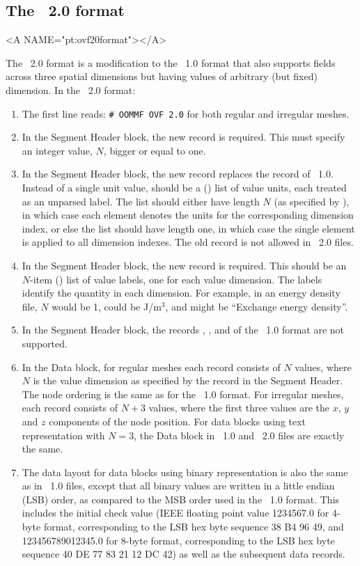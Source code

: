 \subsection{The \OVF\ 2.0 format}\label{sec:ovf20format}
\begin{rawhtml}
<A NAME="pt:ovf20format"></A>
\end{rawhtml}
The \OVF~2.0 format is a modification to the \OVF~1.0 format that also
supports fields across three spatial dimensions but having values of
arbitrary (but fixed) dimension.  In the \OVF~2.0 format:
\begin{enumerate}
\item The first line reads: \verb+# OOMMF OVF 2.0+ for both
regular and irregular meshes.
\item In the Segment Header block, the new record  is
required.  This must specify an integer value, $N$, bigger or equal to
one.
\item In the Segment Header block, the new  record
replaces the  record of \OVF~1.0.  Instead of a single
unit value,  should be a (\Tcl) list of value units, each
treated as an unparsed label.  The list should either have length $N$
(as specified by ), in which case each element denotes
the units for the corresponding dimension index, or else the list
should have length one, in which case the single element is applied to
all dimension indexes.  The old  record is not allowed
in \OVF~2.0 files.
\item In the Segment Header block, the new  record is
required.  This should be an $N$-item (\Tcl) list of value labels, one
for each value dimension.  The labels identify the quantity in each
dimension.  For example, in an energy density file, $N$ would be 1,
 could be J/m${}^3$, and  might be
``Exchange energy density''.
\item In the Segment Header block, the records
, ,  and
 of the \OVF~1.0 format are not supported.
\item In the Data block, for regular meshes each record consists of
$N$ values, where $N$ is the value dimension as specified by the
 record in the Segment Header.  The node ordering is
the same as for the \OVF~1.0 format.  For irregular meshes, each
record consists of $N+3$ values, where the first three values are the
$x$, $y$ and $z$ components of the node position.  For data blocks
using text representation with $N = 3$, the Data block in
\OVF~1.0 and \OVF~2.0 files are exactly the same.
\item The data layout for data blocks using binary representation is
also the same as in \OVF~1.0 files, except that all binary values are
written in a little endian (LSB) order, as compared to the MSB order
used in the \OVF~1.0 format.  This includes the initial check value
(IEEE floating point value 1234567.0 for 4-byte format, corresponding
to the LSB hex byte sequence 38 B4 96 49, and 123456789012345.0 for
8-byte format, corresponding to the LSB hex byte sequence 40 DE 77 83
21 12 DC 42) as well as the subsequent data records.
\end{enumerate}
